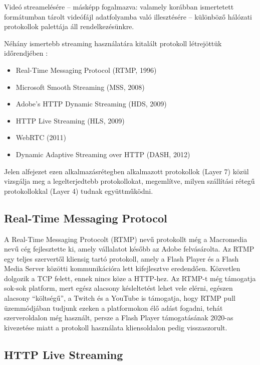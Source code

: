 Videó streamelésére -- másképp fogalmazva: valamely korábban ismertetett formátumban tárolt videófájl adatfolyamba való illesztésére -- különböző hálózati protokollok palettája áll rendelkezésünkre.

Néhány ismertebb streaming használatára kitalált protokoll létrejöttük időrendjében \cite{StreamingHistory}:

\begin{itemize}
	\setlength{\itemsep}{1pt}
  \setlength{\parskip}{0pt}
  \setlength{\parsep}{0pt}
	\item Real-Time Messaging Protocol (RTMP, 1996)
	\item Microsoft Smooth Streaming (MSS, 2008)
	\item Adobe's HTTP Dynamic Streaming (HDS, 2009)
	\item HTTP Live Streaming (HLS, 2009)
	\item WebRTC (2011)
	\item Dynamic Adaptive Streaming over HTTP (DASH, 2012)
\end{itemize}

Jelen alfejezet ezen alkalmazásrétegben alkalmazott protokollok (Layer 7) közül vizsgálja meg a legelterjedtebb protokollokat, megemlítve, milyen szállítási rétegű protokollokkal (Layer 4) tudnak együttműködni.

\subsection{Real-Time Messaging Protocol}

A Real-Time Messaging Protocolt (RTMP) nevű protokollt még a Macromedia nevű cég fejlesztette ki, amely vállalatot később az Adobe felvásárolta. Az RTMP egy teljes szervertől kliensig tartó protokoll, amely a Flash Player és a Flash Media Server közötti kommunikációra lett kifejlesztve eredendően. Közvetlen dolgozik a TCP felett, ennek nincs köze a HTTP-hez. \cite{StreamingHistory} Az RTMP-t még támogatja sok-sok platform, mert egész alacsony késleltetést lehet vele elérni, egészen alacsony ``költségű'', a Twitch és a YouTube is támogatja, hogy RTMP pull üzemmódjában tudjunk ezeken a platformokon élő adást fogadni, tehát szerveroldalon még használt, persze a Flash Player támogatásának 2020-as kivezetése miatt a protokoll használata kliensoldalon pedig visszaszorult.

\subsection{HTTP Live Streaming}

